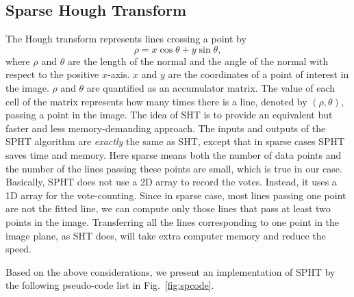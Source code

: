 \documentclass[]{spie}
\begin{document}

\subsection{Sparse Hough Transform}

The Hough transform represents lines crossing a point by 
\begin{equation}
\rho = x \cos\theta + y \sin\theta,
\end{equation}
where $\rho$ and $\theta$ are the length of the normal and the angle of the normal with respect to the positive $x$-axis. $x$ and $y$ are the coordinates of a point of interest in the image.   $\rho$ and $\theta$ are quantified as an accumulator matrix. The value of each cell of the matrix represents how many times there is a line, denoted by $(\rho, \theta)$, passing a point in the image. The idea of SHT is to provide an equivalent but faster and less memory-demanding approach. %
The inputs and outputs of the SPHT algorithm are {\em exactly} the same as SHT, except that in sparse cases SPHT saves time and memory. Here sparse means both the number of data points and the number of the lines passing these points are small, which is true in our case. Basically, SPHT does not use a 2D array to record the votes. Instead, it uses a 1D  array for the  vote-counting. Since in sparse case, most lines passing one point are not the fitted line, we can compute only those lines that pass at least two points in the image. Transferring all the lines corresponding to one point in the image plane, as SHT does, will take extra computer memory and reduce the speed. 

    Based on the above considerations, we present an implementation of SPHT by the following pseudo-code list in Fig.~\ref{fig:spcode}.
\end{document}
